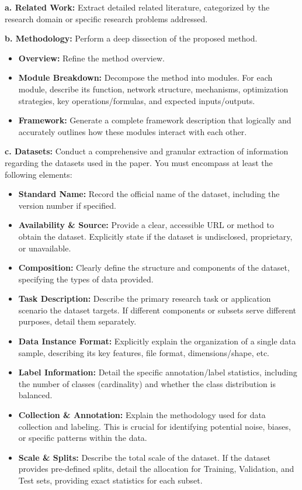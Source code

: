\begin{tcolorbox}
\smallskip
\textbf{a. Related Work:} Extract detailed related literature, categorized by the research domain or specific research problems addressed.

\smallskip
\textbf{b. Methodology:} Perform a deep dissection of the proposed method.
\begin{itemize}[nosep,leftmargin=12pt]
	\item \textbf{Overview:} Refine the method overview.
	\item \textbf{Module Breakdown:} Decompose the method into modules. For each module, describe its function, network structure, mechanisms, optimization strategies, key operations/formulas, and expected inputs/outputs.
	\item \textbf{Framework:} Generate a complete framework description that logically and accurately outlines how these modules interact with each other.
\end{itemize}

\smallskip
\textbf{c. Datasets:} Conduct a comprehensive and granular extraction of information regarding the datasets used in the paper. You must encompass at least the following elements:
\begin{itemize}[nosep,leftmargin=12pt]
	\item \textbf{Standard Name:} Record the official name of the dataset, including the version number if specified.
	\item \textbf{Availability \& Source:} Provide a clear, accessible URL or method to obtain the dataset. Explicitly state if the dataset is undisclosed, proprietary, or unavailable.
	\item \textbf{Composition:} Clearly define the structure and components of the dataset, specifying the types of data provided.
	\item \textbf{Task Description:} Describe the primary research task or application scenario the dataset targets. If different components or subsets serve different purposes, detail them separately.
	\item \textbf{Data Instance Format:} Explicitly explain the organization of a single data sample, describing its key features, file format, dimensions/shape, etc.
	\item \textbf{Label Information:} Detail the specific annotation/label statistics, including the number of classes (cardinality) and whether the class distribution is balanced.
	\item \textbf{Collection \& Annotation:} Explain the methodology used for data collection and labeling. This is crucial for identifying potential noise, biases, or specific patterns within the data.
	\item \textbf{Scale \& Splits:} Describe the total scale of the dataset. If the dataset provides pre-defined splits, detail the allocation for Training, Validation, and Test sets, providing exact statistics for each subset.
\end{itemize}


\end{tcolorbox}
